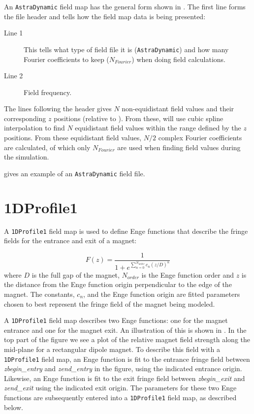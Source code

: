 An \texttt{AstraDynamic} field map has the general form shown in . The first line forms
the file header and tells \opalt how the field map data is being presented:

\begin{description}
\item[Line 1] This tells \opalt what type of field file it is (\texttt{AstraDynamic}) and how many Fourier coefficients to
  keep ($N_{Fourier}$) when doing field calculations.
\item[Line 2] Field frequency.
\end{description}

The lines following the header gives $N$ non-equidistant field values and their corresponding $z$ positions (relative
to ). From these, \opalt will use cubic spline interpolation to find $N$ equidistant field values
within the range defined by the $z$ positions. From these equidistant field values, $N/2$ complex Fourier coefficients
are calculated, of which only $N_{Fourier}$ are used when finding field values during the simulation.

 gives an example of an \texttt{AstraDynamic} field file.



\section{1DProfile1}
\label{sec:1DProfile1}
A \texttt{1DProfile1} field map is used to define Enge functions \cite{enge} that describe the fringe fields for the entrance and exit of a magnet:

\begin{equation*}
  F(z) = \frac{1}{1 + e^{\sum\limits_{n=0}^{N_{order}} c_{n} (z/D)^{n}}}
\end{equation*}
where $D$ is the full gap of the magnet, $N_{order}$ is the Enge function order and $z$ is the distance from the Enge function origin perpendicular to the edge of the magnet. The constants, $c_n$, and the Enge function origin are fitted parameters chosen to best represent the fringe field of the magnet being modeled.

A \texttt{1DProfile1} field map describes two Enge functions: one for the magnet entrance and one for the magnet exit. An illustration of this is shown in . In the top part of the figure we see a plot of the relative magnet field strength along the mid-plane for a rectangular dipole magnet. To describe this field with a \texttt{1DProfile1} field map, an Enge function is fit to the entrance fringe field between \emph{zbegin\_entry} and \emph{zend\_entry} in the figure, using the indicated entrance origin. Likewise, an Enge function is fit to the exit fringe field between \emph{zbegin\_exit} and \emph{zend\_exit} using the indicated exit origin. The parameters for these two Enge functions are subsequently entered into a \texttt{1DProfile1} field map, as described below.

